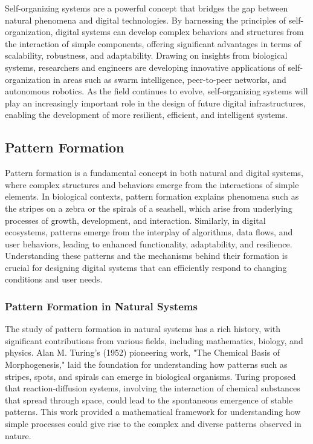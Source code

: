 \documentclass[12pt,twoside]{article}
\begin{document}
Self-organizing systems are a powerful concept that bridges the gap between natural phenomena and digital technologies. By harnessing the principles of self-organization, digital systems can develop complex behaviors and structures from the interaction of simple components, offering significant advantages in terms of scalability, robustness, and adaptability. Drawing on insights from biological systems, researchers and engineers are developing innovative applications of self-organization in areas such as swarm intelligence, peer-to-peer networks, and autonomous robotics. As the field continues to evolve, self-organizing systems will play an increasingly important role in the design of future digital infrastructures, enabling the development of more resilient, efficient, and intelligent systems.

\subsection{Pattern Formation}

Pattern formation is a fundamental concept in both natural and digital systems, where complex structures and behaviors emerge from the interactions of simple elements. In biological contexts, pattern formation explains phenomena such as the stripes on a zebra or the spirals of a seashell, which arise from underlying processes of growth, development, and interaction. Similarly, in digital ecosystems, patterns emerge from the interplay of algorithms, data flows, and user behaviors, leading to enhanced functionality, adaptability, and resilience. Understanding these patterns and the mechanisms behind their formation is crucial for designing digital systems that can efficiently respond to changing conditions and user needs.

\subsubsection{Pattern Formation in Natural Systems}

The study of pattern formation in natural systems has a rich history, with significant contributions from various fields, including mathematics, biology, and physics. Alan M. Turing's (1952) pioneering work, "The Chemical Basis of Morphogenesis," laid the foundation for understanding how patterns such as stripes, spots, and spirals can emerge in biological organisms. Turing proposed that reaction-diffusion systems, involving the interaction of chemical substances that spread through space, could lead to the spontaneous emergence of stable patterns. This work provided a mathematical framework for understanding how simple processes could give rise to the complex and diverse patterns observed in nature.
\end{document}
